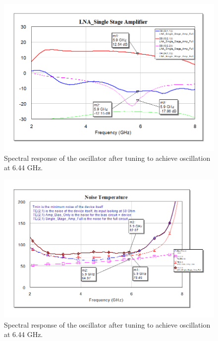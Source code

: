 \documentclass[reprint, aps, prl]{revtex4-1}
\begin{document}
\begin{figure}[!htbp]
    \centering
    \includegraphics[scale=0.35]{LNA_Gain.png}
    \caption{Spectral response of the oscillator after tuning to achieve oscillation at 6.44 GHz.}
    \label{fig:LNAGain}
\end{figure}

\begin{figure}[!htbp]
    \centering
    \includegraphics[scale=0.35]{LNA_Noise_Temperature.png}
    \caption{Spectral response of the oscillator after tuning to achieve oscillation at 6.44 GHz.}
    \label{fig:LNANoiseTemp}
\end{figure}
\end{document}
